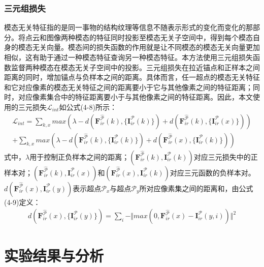     \subsubsection{三元组损失}
    模态无关特征指的是同一事物的结构纹理等信息不随表示形式的变化而变化的那部分。将点云和图像两种模态的特征同时投影至模态无关子空间中，得到每个模态自身的模态无关向量。模态间的损失函数的作用就是让不同模态的模态无关向量更加相似，这有助于通过一种模态特征查询另一种模态特征。本方法使用三元组损失函数监督两种模态在模态无关子空间中的投影。三元组损失在拉近锚点和正样本之间距离的同时，增加锚点与负样本之间的距离。具体而言，任一超点的模态无关特征和它对应像素的模态无关特征之间的距离要小于它与其他像素之间的特征距离；同时，对应像素集合中的特征距离要小于与其他像素之间的特征距离。因此，本文使用的三元损失$\mathcal{L}_{int}$如公式(4-8)所示：
    \begin{equation}
        \begin{aligned}
        \mathcal{L}_{int} = 
        \sum_{k,x} max(\lambda - 
        d(\mathbf{F}^{\hat{\mathcal{P}}}_{ir}(k), \{\mathbf{I}^{\mathcal{P}}_{ir}(k)\}) + 
        d(\mathbf{F}^{\hat{\mathcal{P}}}_{ir}(k), \{\mathbf{I}^{\mathcal{P}}_{ir}(x)\}))
        \\
        +\sum_{k,x} max(\lambda - 
        d(\mathbf{F}^{\hat{\mathcal{P}}}_{ir}(k), \{\mathbf{I}^{\mathcal{P}}_{ir}(k)\}) + 
        d(\mathbf{F}^{\hat{\mathcal{P}}}_{ir}(x), \{\mathbf{I}^{\mathcal{P}}_{ir}(k)\}))
        \end{aligned}
    \end{equation}
    式中，$\lambda$用于控制正负样本之间的距离；$(\mathbf{F}^{\hat{\mathcal{P}}}_{ir}(k), {\mathbf{I}^{\mathcal{P}}_{ir}(k)})$对应三元损失中的正样本对；$(\mathbf{F}^{\hat{\mathcal{P}}}_{ir}(k), {\mathbf{I}^{\mathcal{P}}_{ir}(x)})$和$(\mathbf{F}^{\hat{\mathcal{P}}}_{ir}(x), {\mathbf{I}^{\mathcal{P}}_{ir}(k)})$对应三元函数的负样本对。$d(\mathbf{F}^{\hat{\mathcal{P}}}_{ir}(x), {\mathbf{I}^{\mathcal{P}}_{ir}(y)})$表示超点$\mathcal{P}_x$与超点$\mathcal{P}_y$所对应像素集之间的距离和，由公式(4-9)定义：
    \begin{equation}
        \begin{aligned}
        d(\mathbf{F}^{\hat{\mathcal{P}}}_{ir}(x), \{\mathbf{I}^{\mathcal{P}}_{ir}(y)\}) =
        \sum_i -\Vert max(0, \mathbf{F}^{\hat{\mathcal{P}}}_{ir}(x) - \mathbf{I}^{\mathcal{P}}_{ir}(y,i)) \Vert^2
        \end{aligned}
    \end{equation}

    \section{实验结果与分析}
